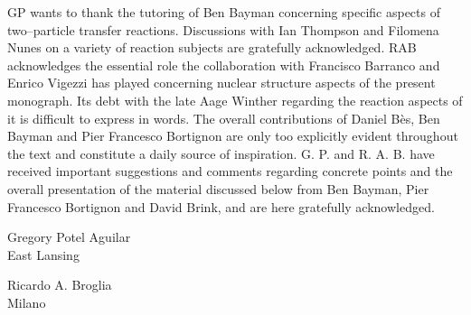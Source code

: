GP wants to thank the tutoring of  Ben Bayman concerning specific aspects of two--particle transfer reactions. Discussions with Ian Thompson and Filomena Nunes on a variety of reaction subjects are gratefully acknowledged. 
RAB  acknowledges the essential role the collaboration with Francisco Barranco and Enrico Vigezzi has played concerning  nuclear structure aspects of the present monograph. Its debt with the late Aage Winther regarding the reaction aspects of it is difficult to express in words. The overall contributions of Daniel B\`{e}s, Ben Bayman and Pier Francesco Bortignon are only too explicitly evident throughout the text and constitute a daily source of inspiration.  G. P. and R. A. B. have received important suggestions and comments regarding concrete points and the overall presentation of the material discussed below from Ben Bayman, Pier Francesco Bortignon and David Brink, and are here gratefully acknowledged.
\begin{flushleft}
Gregory Potel Aguilar\\
 East Lansing
\end{flushleft}
\vspace{-1.7cm}
\begin{flushright}
Ricardo A. Broglia\\
 Milano
\end{flushright}



% 
 
